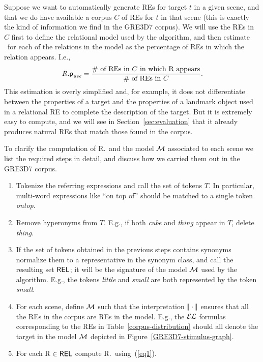Suppose we want to automatically generate REs for target $t$ in a given scene, and that we do have available a corpus $C$ of REs for $t$ in that scene (this is exactly the kind of information we find in the GRE3D7 corpus).  We will use the REs in $C$ first to define the relational model 
used by the algorithm, and then estimate \puse\ for each of the relations in the model as the percentage of REs in which the relation appears.  I.e., 
\begin{equation}\label{eq1}
R.\textsf{p}_\textit{use} = \frac{\# \mbox{ of REs in $C$ in which R appears}}{\# \mbox{ of REs in $C$}}.
\end{equation}
This estimation is overly simplified and, for example, it does not differentiate between the properties of a target and the properties of a landmark object used in a relational RE to complete the description of the target.  But it is extremely easy to compute, and we will see in Section~\ref{sec:evaluation} that it already produces natural REs that match those found in the corpus. 

To clarify the computation of R.\puse\ and the model $\mathcal{M}$ associated to each scene we list the required steps in detail, and discuss how we carried them out in the GRE3D7 corpus.

\vspace*{-.4cm}
\begin{enumerate}
\item Tokenize the referring expressions and call the set of tokens $T$. In particular, multi-word expressions like ``on top of'' should be matched to a single token \emph{ontop}.\\[-2em]

\item Remove hyperonyms from $T$. E.g., if both \emph{cube} and \emph{thing} appear in $T$, delete \emph{thing}.\\[-2em]

\item If the set of tokens obtained in the previous steps contains synonyms normalize them to a representative in the synonym class, and call the resulting set $\textsf{REL}$; it will be the signature of the model $\mathcal{M}$ used by the algorithm. E.g., the tokens \emph{little} and \emph{small} are both represented by the token \emph{small}.\\[-2em]

\item For each scene, define $\mathcal{M}$ such that the interpretation $|\!|\cdot|\!|$ ensures that all the REs in the corpus are REs in the model. E.g., the $\mathcal{EL}$ formulas corresponding to the REs in Table~\ref{corpus-distribution} should all denote the target in the model $\mathcal{M}$ depicted in 
Figure~\ref{GRE3D7-stimulus-graph}.\\[-2em]

\item For each R $\in \textsf{REL}$ compute R.\puse\ using~(\ref{eq1}).\\[-2em]

\end{enumerate}

